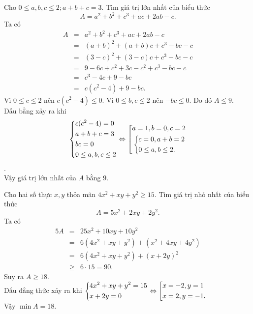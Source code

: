 \begin{bt}%
	Cho $0 \leq a,b,c \leq 2; a+b+c=3$. Tìm giá trị lớn nhất của biểu thức
	$$A= a^2+b^2+c^3+ac+2ab-c.$$ 
	\loigiai
	{Ta có
	{\allowdisplaybreaks
	\begin{eqnarray*}
		A&=&a^2+b^2+c^3+ac+2ab-c \\
		&=& (a+b)^2 +(a+b)c+c^3-bc-c\\
		&=& (3-c)^2+(3-c)c+c^3-bc-c \\
		&=& 9-6c+c^2+3c-c^2+c^3-bc-c\\
		&=& c^3-4c+9-bc \\
		&=& c(c^2-4)+9-bc.
	\end{eqnarray*}}
	Vì $0 \leq c \leq 2$ nên $c(c^2-4) \leq 0$. Vì $0 \leq b,c \leq 2$ nên $-bc \leq 0$. Do đó $A \leq 9$. \\
	Dấu bằng xảy ra khi$$ \left\{\begin{aligned}&c(c^2-4)=0\\&a+b+c=3\\&bc=0 \\ &0 \leq a,b,c \leq 2\end{aligned}\right. \Leftrightarrow \left[\begin{aligned}&a=1,b=0,c=2 \\ &\left\{\begin{aligned}&c=0, a+b =2 \\ &0\leq a,b \leq 2.\end{aligned}\right.\end{aligned}\right. $$.\\
	Vậy giá trị lớn nhất của $A$ bằng $9$.
	}
\end{bt}

\begin{bt}%
	Cho hai số thực $x,y$ thỏa mãn $4x^2+xy+y^2 \ge 15$. Tìm giá trị nhỏ nhất của biểu thức $$A=5x^2+2xy+2y^2.$$  
	\loigiai
	{Ta có 
	{\allowdisplaybreaks
	\begin{eqnarray*}
	5A & = & 25x^2 + 10xy +10 y^2 \\
	& = & 6(4x^2 +xy+y^2) + (x^2 +4xy +4y^2) \\
	&=& 6(4x^2 +xy+y^2) + (x+2y)^2 \\
	& \geq & 6 \cdot 15 =90.
	\end{eqnarray*}}
	Suy ra $A \geq 18$. \\
	Dấu đẳng thức xảy ra khi $\left\{\begin{aligned}& 4x^2+xy+y^2 = 15 \\ &x+2y =0\end{aligned}\right. \Leftrightarrow \left[\begin{aligned}& x=-2, y=1 \\ &x=2,y=-1.\end{aligned}\right.$
	\\ Vậy $\min A =18$. 
	}
\end{bt}

